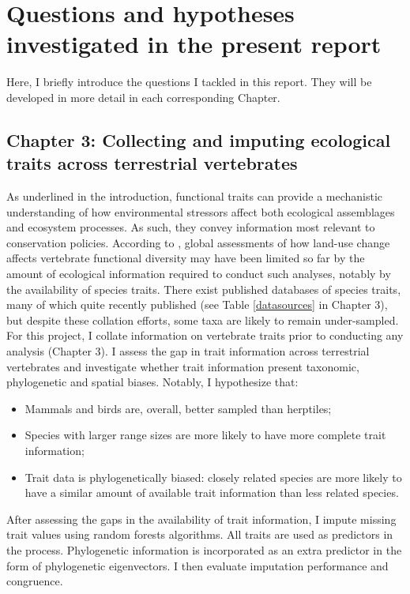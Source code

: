 \section{Questions and hypotheses investigated in the present report}
Here, I briefly introduce the questions I tackled in this report. They will be developed in more detail in each corresponding Chapter.

\subsection{Chapter 3: Collecting and imputing ecological traits across terrestrial vertebrates}

As underlined in the introduction, functional traits can provide a mechanistic understanding of how environmental stressors affect both ecological assemblages and ecosystem processes. As such, they convey information most relevant to conservation policies. According to \citet{Hekkala2018}, global assessments of how land-use change affects vertebrate functional diversity may have been limited so far by the amount of ecological information required to conduct such analyses, notably by the availability of species traits. There exist published databases of species traits, many of which quite recently published (see Table \ref{datasources} in Chapter 3), but despite these collation efforts, some taxa are likely to remain under-sampled. For this project, I collate information on vertebrate traits prior to conducting any analysis (Chapter 3). I assess the gap in trait information across terrestrial vertebrates and investigate whether trait information present taxonomic, phylogenetic and spatial biases. Notably, I hypothesize that:
 \begin{itemize}
\item Mammals and birds are, overall, better sampled than herptiles;
\item Species with larger range sizes are more likely to have more complete trait information;
\item Trait data is phylogenetically biased: closely related species are more likely to have a similar amount of available trait information than less related species.
\end{itemize}

After assessing the gaps in the availability of trait information, I impute missing trait values using random forests algorithms. All traits are used as predictors in the process. Phylogenetic information is incorporated as an extra predictor in the form of phylogenetic eigenvectors. I then evaluate imputation performance and congruence. 

